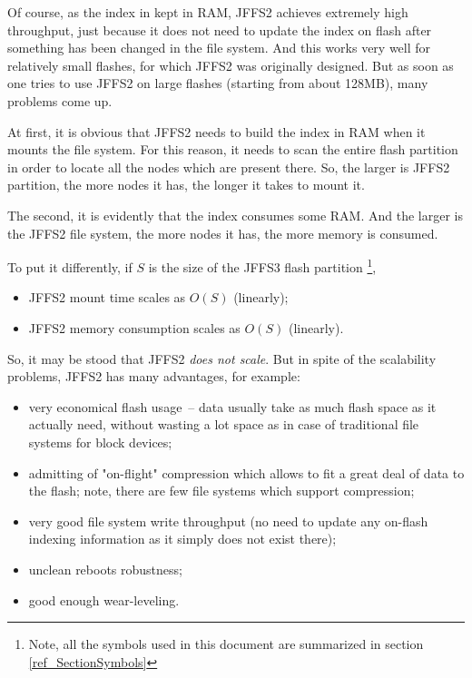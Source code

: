 \documentclass[12pt,a4paper,oneside,titlepage]{article}
\begin{document}
Of course, as the index in kept in RAM, JFFS2 achieves extremely high
throughput, just because it does not need to update the index on flash after
something has been changed in the file system. And this works very well for
relatively small flashes, for which JFFS2 was originally designed. But as soon
as one tries to use JFFS2 on large flashes (starting from about 128MB), many
problems come up.

At first, it is obvious that JFFS2 needs to build the index in RAM when it
mounts the file system. For this reason, it needs to scan the entire flash
partition in order to locate all the nodes which are present there. So, the
larger is JFFS2 partition, the more nodes it has, the longer it takes to mount
it.

The second, it is evidently that the index consumes some RAM. And the larger is
the JFFS2 file system, the more nodes it has, the more memory is consumed.

To put it differently, if $S$ is the size of the JFFS3 flash partition
\footnote{Note, all the symbols used in this document are summarized in
section \ref{ref_SectionSymbols}},

\begin{itemize}

\item JFFS2 mount time scales as $O(S)$ (linearly);

\item JFFS2 memory consumption scales as $O(S)$ (linearly).

\end{itemize}

So, it may be stood that JFFS2 \emph{does not scale}. But in spite of the
scalability problems, JFFS2 has many advantages, for example:

\begin{itemize}

\item very economical flash usage~-- data usually take as much flash
space as it actually need, without wasting a lot space as in case of
traditional file systems for block devices;

\item admitting of "\mbox{on-flight}" compression which allows to fit a great
deal of data to the flash; note, there are few file systems which support
compression;

\item very good file system write throughput (no need to update any
\mbox{on-flash} indexing information as it simply does not exist there);

\item unclean reboots robustness;

\item good enough \mbox{wear-leveling}.

\end{itemize}
\end{document}
